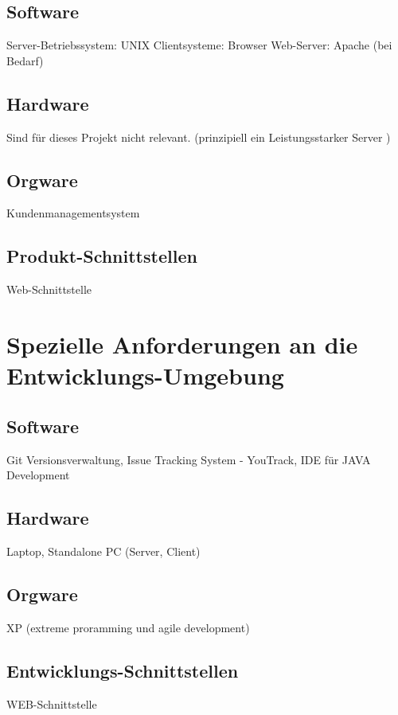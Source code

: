 		\subsection{Software}
		Server-Betriebssystem: UNIX
		Clientsysteme: Browser
		Web-Server: Apache (bei Bedarf)
		
		\subsection{Hardware}
		Sind für dieses Projekt nicht relevant. (prinzipiell ein Leistungsstarker Server )
		\subsection{Orgware}
		Kundenmanagementsystem
		\subsection{Produkt-Schnittstellen}
		
		Web-Schnittstelle
		
		
	\section{Spezielle Anforderungen an die Entwicklungs-Umgebung}
		\subsection{Software}
		Git Versionsverwaltung, Issue Tracking System - YouTrack, IDE für JAVA Development
		
		\subsection{Hardware}
		Laptop, Standalone PC (Server, Client)
		\subsection{Orgware}
		XP (extreme proramming und agile development)	
		\subsection{Entwicklungs-Schnittstellen}
		WEB-Schnittstelle
		
